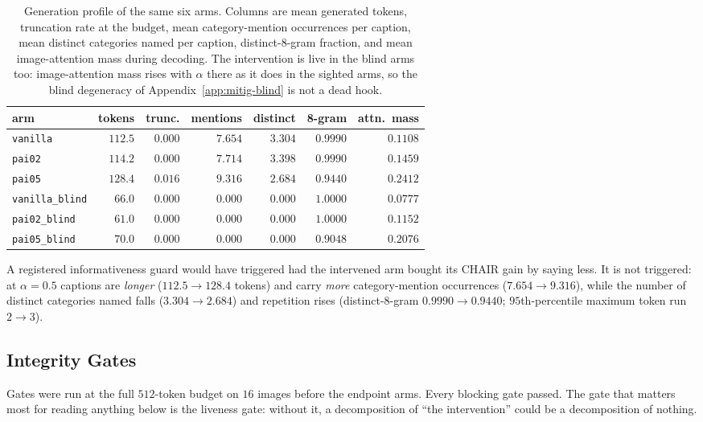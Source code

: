 \begin{table}[htb]
\caption{Generation profile of the same six arms. Columns are mean generated tokens, truncation
rate at the budget, mean category-mention occurrences per caption, mean distinct categories named
per caption, distinct-8-gram fraction, and mean image-attention mass during decoding. The
intervention is live in the blind arms too:
image-attention mass rises with $\alpha$ there as it does in the sighted arms, so the blind
degeneracy of Appendix~\ref{app:mitig-blind} is not a dead hook.}
\label{tab:mdprofile}
\begin{center}
\small
\begin{tabular}{lrrrrrr}
\toprule
arm & tokens & trunc. & mentions & distinct & 8-gram & attn.\ mass \\
\midrule
\texttt{vanilla} & $112.5$ & $0.000$ & $7.654$ & $3.304$ & $0.9990$ & $0.1108$ \\
\texttt{pai02} & $114.2$ & $0.000$ & $7.714$ & $3.398$ & $0.9990$ & $0.1459$ \\
\texttt{pai05} & $128.4$ & $0.016$ & $9.316$ & $2.684$ & $0.9440$ & $0.2412$ \\
\midrule
\texttt{vanilla\_blind} & $66.0$ & $0.000$ & $0.000$ & $0.000$ & $1.0000$ & $0.0777$ \\
\texttt{pai02\_blind} & $61.0$ & $0.000$ & $0.000$ & $0.000$ & $1.0000$ & $0.1152$ \\
\texttt{pai05\_blind} & $70.0$ & $0.000$ & $0.000$ & $0.000$ & $0.9048$ & $0.2076$ \\
\bottomrule
\end{tabular}
\end{center}
\end{table}

A registered informativeness guard would have triggered had the intervened arm bought its CHAIR gain by
saying less. It is not triggered: at $\alpha = 0.5$ captions are \emph{longer} ($112.5 \rightarrow
128.4$ tokens) and carry \emph{more} category-mention occurrences ($7.654 \rightarrow 9.316$), while
the number of distinct categories named falls ($3.304 \rightarrow 2.684$) and repetition rises
(distinct-8-gram $0.9990 \rightarrow 0.9440$; $95$th-percentile maximum token run $2 \rightarrow
3$).

\subsection{Integrity Gates}
\label{app:mitig-gates}

Gates were run at the full $512$-token budget on $16$ images before the endpoint arms. Every
blocking gate passed. The gate that matters most for reading anything below is the liveness gate:
without it, a decomposition of ``the intervention'' could be a decomposition of nothing.

